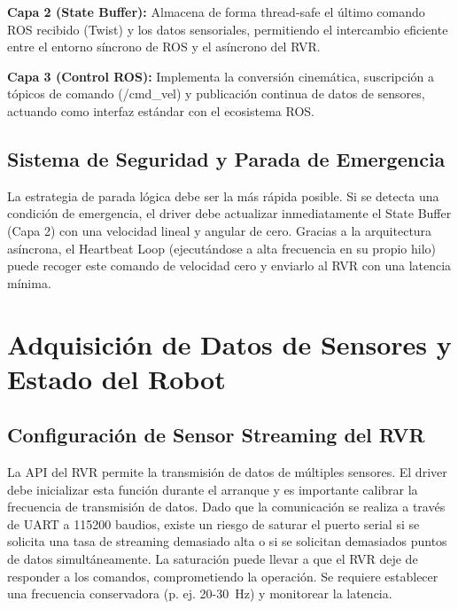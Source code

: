 \documentclass[11pt]{article}
\newcommand{\code}[1]{\textcolor{codeblue}{\url{#1}}}
\numberwithin{figure}{section}
\numberwithin{table}{section}
\def\code#1{#1}%
\begin{document}
\textbf{Capa 2 (State Buffer):} Almacena de forma thread-safe el último comando ROS recibido (Twist) y los datos sensoriales, permitiendo el intercambio eficiente entre el entorno síncrono de ROS y el asíncrono del RVR.

\textbf{Capa 3 (Control ROS):} Implementa la conversión cinemática, suscripción a tópicos de comando (\code{/cmd\_vel}) y publicación continua de datos de sensores, actuando como interfaz estándar con el ecosistema ROS.


\subsection{Sistema de Seguridad y Parada de Emergencia}

La estrategia de parada lógica debe ser la más rápida posible. Si se detecta una condición de emergencia, el driver debe actualizar inmediatamente el State Buffer (Capa 2) con una velocidad lineal y angular de cero. Gracias a la arquitectura asíncrona, el Heartbeat Loop (ejecutándose a alta frecuencia en su propio hilo) puede recoger este comando de velocidad cero y enviarlo al RVR con una latencia mínima.




\newpage


\section{Adquisición de Datos de Sensores y Estado del Robot}


\subsection{Configuración de Sensor Streaming del RVR}

La API del RVR permite la transmisión de datos de múltiples sensores. El driver debe inicializar esta función durante el arranque y es importante calibrar la frecuencia de transmisión de datos. Dado que la comunicación se realiza a través de UART a 115200 baudios, existe un riesgo de saturar el puerto serial si se solicita una tasa de streaming demasiado alta o si se solicitan demasiados puntos de datos simultáneamente. La saturación puede llevar a que el RVR deje de responder a los comandos, comprometiendo la operación. Se requiere establecer una frecuencia conservadora (p. ej. 20-30~Hz) y monitorear la latencia.
\end{document}
